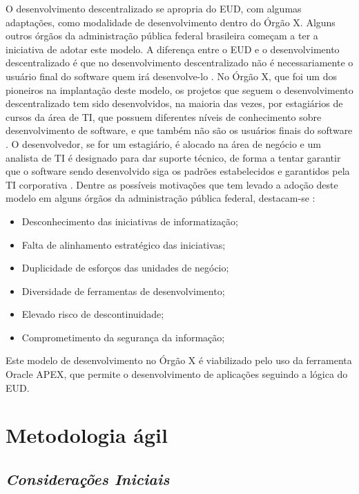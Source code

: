 O desenvolvimento descentralizado se apropria do EUD, com algumas adaptações, como modalidade de desenvolvimento dentro do Órgão X. Alguns outros órgãos da administração pública federal brasileira começam a ter a iniciativa de adotar este modelo. A diferença entre o EUD e o desenvolvimento descentralizado é que no desenvolvimento descentralizado não é necessariamente o usuário final do software quem irá desenvolve-lo \cite{artigoTcuGovTI}. No Órgão X, que foi um dos pioneiros na implantação deste modelo, os projetos que seguem o desenvolvimento descentralizado tem sido desenvolvidos, na maioria das vezes, por estagiários de cursos da área de TI, que possuem diferentes níveis de conhecimento sobre desenvolvimento de software, e que também não são os usuários finais do software \cite{artigoTcuGovTI}. O desenvolvedor, se for um estagiário, é alocado na área de negócio e um analista de TI é designado para dar suporte técnico, de forma a tentar garantir que o software sendo desenvolvido siga os padrões estabelecidos e garantidos pela TI corporativa \cite{artigoTcuGovTI}.
Dentre as possíveis motivações que tem levado a adoção deste modelo em alguns órgãos da administração pública federal, destacam-se \cite{slideTCU}:

\begin{itemize}
\item Desconhecimento das iniciativas de informatização;
\item Falta de alinhamento estratégico das iniciativas;
\item Duplicidade de esforços das unidades de negócio;
\item Diversidade de ferramentas de desenvolvimento;
\item Elevado risco de descontinuidade;
\item Comprometimento da segurança da informação;
\end{itemize}

Este modelo de desenvolvimento no Órgão X é viabilizado pelo uso da ferramenta Oracle APEX, que permite o desenvolvimento de aplicações seguindo a lógica do EUD.
\clearpage

\chapter[Metodologia ágil]{Metodologia ágil}

\section{\textit{Considerações Iniciais}}

